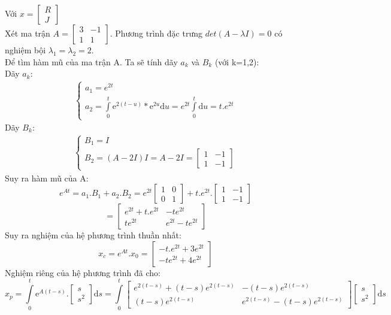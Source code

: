 \hspace{0.3cm}Với $x=
\begin{bmatrix}
    R\\
    J
\end{bmatrix}$\\
Xét ma trận $A=
\begin{bmatrix}
    3&-1\\
    1&1
\end{bmatrix}.
$
 Phương trình đặc trưng $det(A- \lambda I)=0$ có nghiệm bội $\lambda_1=\lambda_2=2$.\\
Để tìm hàm mũ của ma trận A. Ta sẽ tính dãy $a_k$ và $B_k$ (với k=1,2):\\
Dãy $a_k$:
\begin{align*}
    \begin{cases}
        a_1=e^{2t}\\
        a_2=\displaystyle\int\limits_{0}^{t} \mathrm{e}^{2(t-u)}*\mathrm{e}^{2u}\mathrm{d}u=e^{2t}\displaystyle\int\limits_{0}^{t}\mathrm{d}u=t.e^{2t}
    \end{cases}
\end{align*}
Dãy $B_k$:
\begin{align*}
    \begin{cases}
        B_1=I\\
        B_2=(A-2I)I=A-2I=
        \begin{bmatrix}
            1 &-1\\
            1 &-1
        \end{bmatrix}
    \end{cases}
\end{align*}
Suy ra hàm mũ của A:
$$e^{At}=a_1.B_1+a_2.B_2=
e^{2t}
\begin{bmatrix}
    1 &0\\
    0&1
\end{bmatrix}
+ t.e^{2t}.
\begin{bmatrix}
    1&-1\\
    1&-1
\end{bmatrix}
$$
$$=
\begin{bmatrix}
    e^{2t}+t.e^{2t}&-te^{2t}\\
    te^{2t} & e^{2t}-te^{2t}
\end{bmatrix}$$
Suy ra nghiệm của hệ phương trình thuần nhất:
$$x_c=e^{At}.x_0=
\begin{bmatrix}
    -t.e^{2t}+3e^{2t}\\
    -te^{2t}+4e^{2t}
\end{bmatrix}
$$
Nghiệm riêng của hệ phương trình đã cho:
$$
    x_p=\displaystyle\int\limits_{0}^{t} \mathrm{e}^{A(t-s)}.
    \begin{bmatrix}
    s\\
    s^2
\end{bmatrix}
    \mathrm{d}s
=\displaystyle\int\limits_{0}^{t}
\begin{bmatrix}
    e^{2(t-s)}+(t-s)e^{2(t-s)} & -(t-s)e^{2(t-s)}\\
    (t-s)e^{2(t-s)} & e^{2(t-s)}-(t-s)e^{2(t-s)}
\end{bmatrix}
\begin{bmatrix}
    s\\
    s^2
\end{bmatrix}
\mathrm{d}s
$$
